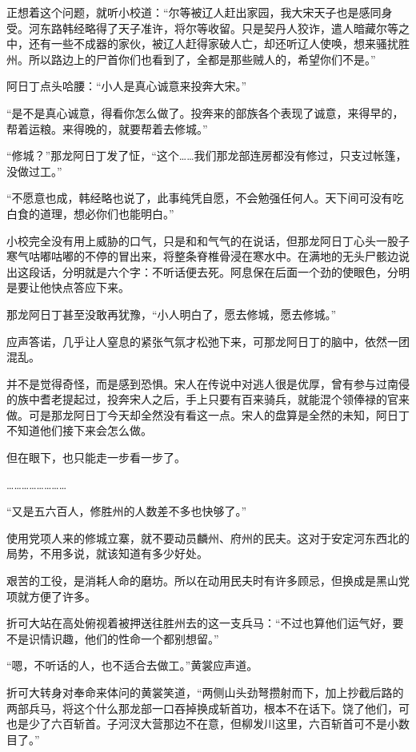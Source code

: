 正想着这个问题，就听小校道：“尔等被辽人赶出家园，我大宋天子也是感同身受。河东路韩经略得了天子准许，将尔等收留。只是契丹人狡诈，遣人暗藏尔等之中，还有一些不成器的家伙，被辽人赶得家破人亡，却还听辽人使唤，想来骚扰胜州。所以路边上的尸首你们也看到了，全都是那些贼人的，希望你们不是。”

阿日丁点头哈腰：“小人是真心诚意来投奔大宋。”

“是不是真心诚意，得看你怎么做了。投奔来的部族各个表现了诚意，来得早的，帮着运粮。来得晚的，就要帮着去修城。”

“修城？”那龙阿日丁发了怔，“这个……我们那龙部连房都没有修过，只支过帐篷，没做过工。”

“不愿意也成，韩经略也说了，此事纯凭自愿，不会勉强任何人。天下间可没有吃白食的道理，想必你们也能明白。”

小校完全没有用上威胁的口气，只是和和气气的在说话，但那龙阿日丁心头一股子寒气咕嘟咕嘟的不停的冒出来，将整条脊椎骨浸在寒水中。在满地的无头尸骸边说出这段话，分明就是六个字：不听话便去死。阿息保在后面一个劲的使眼色，分明是要让他快点答应下来。

那龙阿日丁甚至没敢再犹豫，“小人明白了，愿去修城，愿去修城。”

应声答诺，几乎让人窒息的紧张气氛才松弛下来，可那龙阿日丁的脑中，依然一团混乱。

并不是觉得奇怪，而是感到恐惧。宋人在传说中对逃人很是优厚，曾有参与过南侵的族中耆老提起过，投奔宋人之后，手上只要有百来骑兵，就能混个领俸禄的官来做。可是那龙阿日丁今天却全然没有看这一点。宋人的盘算是全然的未知，阿日丁不知道他们接下来会怎么做。

但在眼下，也只能走一步看一步了。

……………………

“又是五六百人，修胜州的人数差不多也快够了。”

使用党项人来的修城立寨，就不要动员麟州、府州的民夫。这对于安定河东西北的局势，不用多说，就该知道有多少好处。

艰苦的工役，是消耗人命的磨坊。所以在动用民夫时有许多顾忌，但换成是黑山党项就方便了许多。

折可大站在高处俯视着被押送往胜州去的这一支兵马：“不过也算他们运气好，要不是识情识趣，他们的性命一个都别想留。”

“嗯，不听话的人，也不适合去做工。”黄裳应声道。

折可大转身对奉命来体问的黄裳笑道，“两侧山头劲弩攒射而下，加上抄截后路的两部兵马，将这个什么那龙部一口吞掉换成斩首功，根本不在话下。饶了他们，可也是少了六百斩首。子河汊大营那边不在意，但柳发川这里，六百斩首可不是小数目了。”

